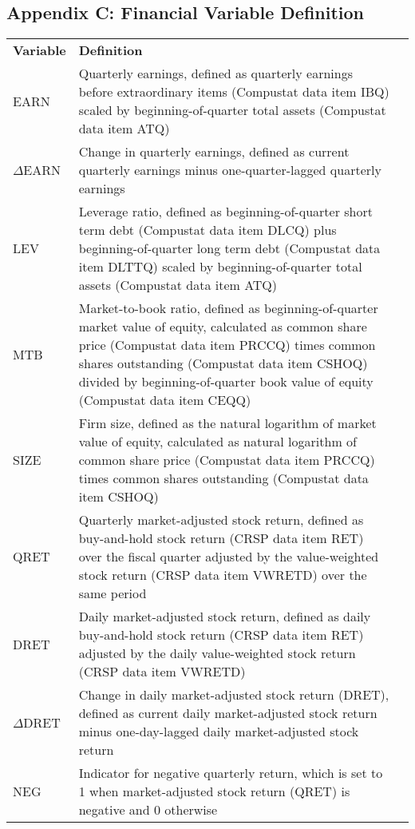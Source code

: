 \subsection*{Appendix C: Financial Variable Definition}
\label{appc}
\begin{table}[H]
	\centering
	\begin{tabular}{lp{15cm}p{15cm}}
		\textbf{Variable} & \textbf{Definition} \\
		
		EARN & Quarterly earnings, defined as quarterly earnings before extraordinary items (Compustat data item IBQ) scaled by beginning-of-quarter total assets (Compustat data item ATQ) \\
		$\Delta$EARN & Change in quarterly earnings, defined as current quarterly earnings minus one-quarter-lagged quarterly earnings \\
		LEV & Leverage ratio, defined as beginning-of-quarter short term debt (Compustat data item DLCQ) plus beginning-of-quarter long term debt (Compustat data item DLTTQ) scaled by beginning-of-quarter total assets (Compustat data item ATQ) \\
		MTB & Market-to-book ratio, defined as beginning-of-quarter market value of equity, calculated as common share price (Compustat data item PRCCQ) times common shares outstanding (Compustat data item CSHOQ) divided by beginning-of-quarter book value of equity (Compustat data item CEQQ) \\
		SIZE & Firm size, defined as the natural logarithm of market value of equity, calculated as natural logarithm of common share price (Compustat data item PRCCQ) times common shares outstanding (Compustat data item CSHOQ) \\
		QRET & Quarterly market-adjusted stock return, defined as buy-and-hold stock return (CRSP data item RET) over the fiscal quarter adjusted by the value-weighted stock return (CRSP data item VWRETD) over the same period \\
		DRET & Daily market-adjusted stock return, defined as daily buy-and-hold stock return (CRSP data item RET) adjusted by the daily value-weighted stock return (CRSP data item VWRETD)\\
		$\Delta$DRET & Change in daily market-adjusted stock return (DRET), defined as current daily market-adjusted stock return minus one-day-lagged daily market-adjusted stock return \\
		NEG & Indicator for negative quarterly return, which is set to 1 when market-adjusted stock return (QRET) is negative and 0 otherwise \\

\end{tabular}
\end{table}
